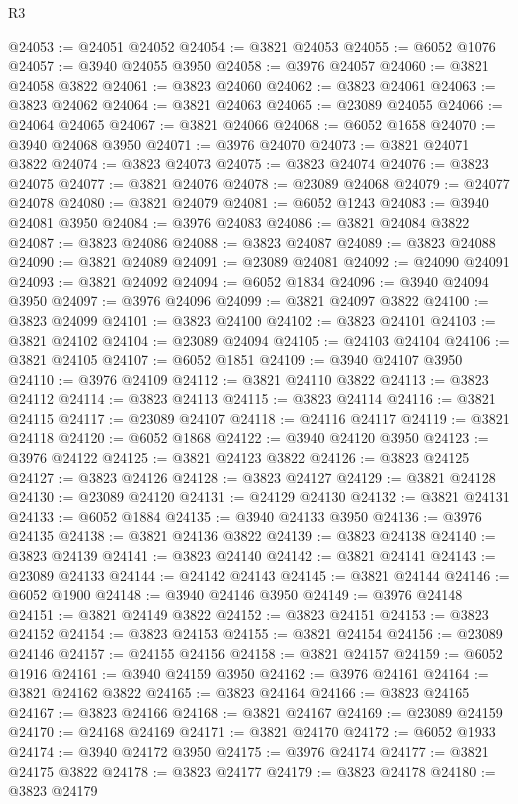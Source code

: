\begin{lexlean}{R3}
\begin{coremodule}
@24053 := @24051 @24052
@24054 := @3821 @24053
@24055 := @6052 @1076
@24057 := @3940 @24055 @3950
@24058 := @3976 @24057
@24060 := @3821 @24058 @3822
@24061 := @3823 @24060
@24062 := @3823 @24061
@24063 := @3823 @24062
@24064 := @3821 @24063
@24065 := @23089 @24055
@24066 := @24064 @24065
@24067 := @3821 @24066
@24068 := @6052 @1658
@24070 := @3940 @24068 @3950
@24071 := @3976 @24070
@24073 := @3821 @24071 @3822
@24074 := @3823 @24073
@24075 := @3823 @24074
@24076 := @3823 @24075
@24077 := @3821 @24076
@24078 := @23089 @24068
@24079 := @24077 @24078
@24080 := @3821 @24079
@24081 := @6052 @1243
@24083 := @3940 @24081 @3950
@24084 := @3976 @24083
@24086 := @3821 @24084 @3822
@24087 := @3823 @24086
@24088 := @3823 @24087
@24089 := @3823 @24088
@24090 := @3821 @24089
@24091 := @23089 @24081
@24092 := @24090 @24091
@24093 := @3821 @24092
@24094 := @6052 @1834
@24096 := @3940 @24094 @3950
@24097 := @3976 @24096
@24099 := @3821 @24097 @3822
@24100 := @3823 @24099
@24101 := @3823 @24100
@24102 := @3823 @24101
@24103 := @3821 @24102
@24104 := @23089 @24094
@24105 := @24103 @24104
@24106 := @3821 @24105
@24107 := @6052 @1851
@24109 := @3940 @24107 @3950
@24110 := @3976 @24109
@24112 := @3821 @24110 @3822
@24113 := @3823 @24112
@24114 := @3823 @24113
@24115 := @3823 @24114
@24116 := @3821 @24115
@24117 := @23089 @24107
@24118 := @24116 @24117
@24119 := @3821 @24118
@24120 := @6052 @1868
@24122 := @3940 @24120 @3950
@24123 := @3976 @24122
@24125 := @3821 @24123 @3822
@24126 := @3823 @24125
@24127 := @3823 @24126
@24128 := @3823 @24127
@24129 := @3821 @24128
@24130 := @23089 @24120
@24131 := @24129 @24130
@24132 := @3821 @24131
@24133 := @6052 @1884
@24135 := @3940 @24133 @3950
@24136 := @3976 @24135
@24138 := @3821 @24136 @3822
@24139 := @3823 @24138
@24140 := @3823 @24139
@24141 := @3823 @24140
@24142 := @3821 @24141
@24143 := @23089 @24133
@24144 := @24142 @24143
@24145 := @3821 @24144
@24146 := @6052 @1900
@24148 := @3940 @24146 @3950
@24149 := @3976 @24148
@24151 := @3821 @24149 @3822
@24152 := @3823 @24151
@24153 := @3823 @24152
@24154 := @3823 @24153
@24155 := @3821 @24154
@24156 := @23089 @24146
@24157 := @24155 @24156
@24158 := @3821 @24157
@24159 := @6052 @1916
@24161 := @3940 @24159 @3950
@24162 := @3976 @24161
@24164 := @3821 @24162 @3822
@24165 := @3823 @24164
@24166 := @3823 @24165
@24167 := @3823 @24166
@24168 := @3821 @24167
@24169 := @23089 @24159
@24170 := @24168 @24169
@24171 := @3821 @24170
@24172 := @6052 @1933
@24174 := @3940 @24172 @3950
@24175 := @3976 @24174
@24177 := @3821 @24175 @3822
@24178 := @3823 @24177
@24179 := @3823 @24178
@24180 := @3823 @24179

\end{coremodule}
\end{lexlean}
